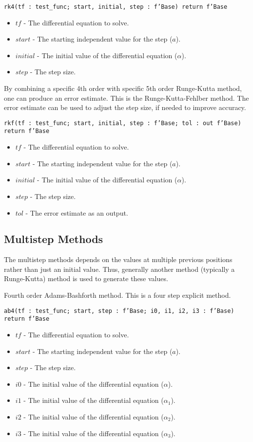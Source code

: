 \documentclass[10pt, openany]{book}
\newcommand{\function}[1]{\texttt{#1}}
\begin{document}
\function{rk4(tf : test\_func; start, initial, step : f'Base) return f'Base}
\begin{itemize}
  \item $tf$ - The differential equation to solve.
  \item $start$ - The starting independent value for the step ($a$).
  \item $initial$ - The initial value of the differential equation ($\alpha$).
  \item $step$ - The step size.
\end{itemize}

By combining a specific 4th order with specific 5th order Runge-Kutta method, one can produce an error estimate.  This is the Runge-Kutta-Fehlber method.  The error estimate can be used to adjust the step size, if needed to improve accuracy.

\function{rkf(tf : test\_func; start, initial, step : f'Base; tol : out f'Base) return f'Base}
\begin{itemize}
  \item $tf$ - The differential equation to solve.
  \item $start$ - The starting independent value for the step ($a$).
  \item $initial$ - The initial value of the differential equation ($\alpha$).
  \item $step$ - The step size.
  \item $tol$ - The error estimate as an output.
\end{itemize}

\subsection{Multistep Methods}
The multistep methods depends on the values at multiple previous positions rather than just an initial value.  Thus, generally another method (typically a Runge-Kutta) method is used to generate these values.

Fourth order Adams-Bashforth method.  This is a four step explicit method.

\function{ab4(tf : test\_func; start, step : f'Base; i0, i1, i2, i3 : f'Base) return f'Base}
\begin{itemize}
  \item $tf$ - The differential equation to solve.
  \item $start$ - The starting independent value for the step ($a$).
  \item $step$ - The step size.
  \item $i0$ - The initial value of the differential equation ($\alpha$).
  \item $i1$ - The initial value of the differential equation ($\alpha_1$).
  \item $i2$ - The initial value of the differential equation ($\alpha_2$).
  \item $i3$ - The initial value of the differential equation ($\alpha_3$).
\end{itemize}
\end{document}
